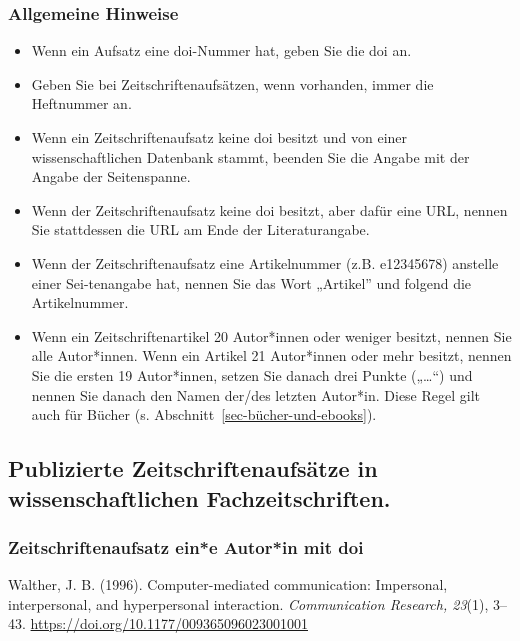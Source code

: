 \documentclass[
  letterpaper,
  DIV=11]{scrreprt}
\begin{document}
\subsubsection{\texorpdfstring{\textbf{Allgemeine
Hinweise}}{Allgemeine Hinweise}}\label{allgemeine-hinweise-3}

\begin{itemize}
\item
  Wenn ein Aufsatz eine doi-Nummer hat, geben Sie die doi an.
\item
  Geben Sie bei Zeitschriftenaufsätzen, wenn vorhanden, immer die
  Heftnummer an.
\item
  Wenn ein Zeitschriftenaufsatz keine doi besitzt und von einer
  wissenschaftlichen Datenbank stammt, beenden Sie die Angabe mit der
  Angabe der Seitenspanne.
\item
  Wenn der Zeitschriftenaufsatz keine doi besitzt, aber dafür eine URL,
  nennen Sie stattdessen die URL am Ende der Literaturangabe.
\item
  Wenn der Zeitschriftenaufsatz eine Artikelnummer (z.B. e12345678)
  anstelle einer Sei-tenangabe hat, nennen Sie das Wort „Artikel'' und
  folgend die Artikelnummer.
\item
  Wenn ein Zeitschriftenartikel 20 Autor*innen oder weniger besitzt,
  nennen Sie alle Autor*innen. Wenn ein Artikel 21 Autor*innen oder mehr
  besitzt, nennen Sie die ersten 19 Autor*innen, setzen Sie danach drei
  Punkte („\ldots``) und nennen Sie danach den Namen der/des letzten
  Autor*in. Diese Regel gilt auch für Bücher (s.
  Abschnitt~\ref{sec-bücher-und-ebooks}).
\end{itemize}

\subsection{Publizierte Zeitschriftenaufsätze in wissenschaftlichen
Fachzeitschriften.}\label{publizierte-zeitschriftenaufsuxe4tze-in-wissenschaftlichen-fachzeitschriften.}

\subsubsection{Zeitschriftenaufsatz \textbar{} ein*e Autor*in \textbar{}
mit doi}\label{zeitschriftenaufsatz-eine-autorin-mit-doi}

Walther, J. B. (1996). Computer-mediated communication: Impersonal,
interpersonal, and hyperpersonal interaction. \emph{Communication
Research, 23}(1), 3--43.
\url{https://doi.org/10.1177/009365096023001001}
\end{document}
